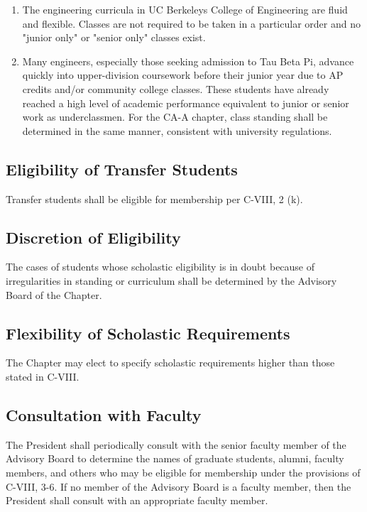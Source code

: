 \documentclass{article}
\begin{document}
\begin{enumerate}[\indent (a)]
		\begin{enumerate}[\indent 1)]
			\item The engineering curricula in UC Berkeley\textquotesingle s College of Engineering are fluid and flexible. Classes are not required to be taken in a particular order and no "junior only" or "senior only" classes exist.
			\item Many engineers, especially those seeking admission to Tau Beta Pi, advance quickly into upper-division coursework before their junior year due to AP credits and/or community college classes. These students have already reached a high level of academic performance equivalent to junior or senior work as underclassmen. For the CA-A chapter, class standing shall be determined in the same manner, consistent with university regulations.
		\end{enumerate}
	\end{enumerate}
	\subsection{Eligibility of Transfer Students}
	Transfer students shall be eligible for membership per C-VIII, 2 (k).
	\subsection{Discretion of Eligibility}
	The cases of students whose scholastic eligibility is in doubt because of irregularities in standing or curriculum shall be determined by the Advisory Board of the Chapter.
	\subsection{Flexibility of Scholastic Requirements}
	The Chapter may elect to specify scholastic requirements higher than those stated in C-VIII.
	\subsection{Consultation with Faculty}
	The President shall periodically consult with the senior faculty member of the Advisory Board to determine the names of graduate students, alumni, faculty members, and others who may be eligible for membership under the provisions of C-VIII, 3-6. If no member of the Advisory Board is a faculty member, then the President shall consult with an appropriate faculty member.
\end{document}
